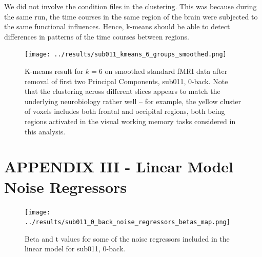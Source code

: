 \documentclass[11pt]{article}
\begin{document}
We did not involve the condition files in the clustering. This was because during
the same run, the time courses in the same region of the brain were subjected to the
same functional influences. Hence, k-means should be able to detect differences in
patterns of the time courses between regions.

\begin{figure}[H]
\centering
\texttt{[image: ../results/sub011\_kmeans\_6\_groups\_smoothed.png]}
\caption{K-means result for $k=6$ on smoothed standard fMRI data after removal of first two Principal Components, sub011, 0-back. Note that the clustering across different slices appears to match the underlying neurobiology rather well -- for example, the yellow cluster of voxels includes both frontal and occipital regions, both being regions activated in the visual working memory tasks considered in this analysis.}
\end{figure} 

\section{APPENDIX III - Linear Model Noise Regressors}

\begin{figure}[H]
\centering
\texttt{[image: ../results/sub011\_0\_back\_noise\_regressors\_betas\_map.png]}
\caption{Beta and t values for some of the noise regressors included in the linear model for sub011, 0-back.}
\end{figure} 
\end{document}
